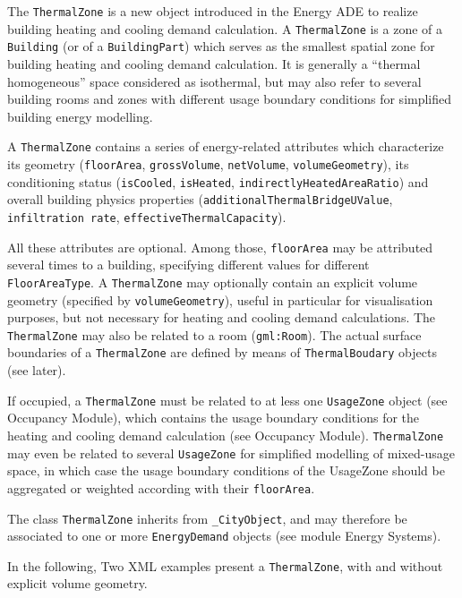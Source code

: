 \documentclass[a4paper,12pt]{article}
\begin{document}
The \lstinline!ThermalZone! is a new object introduced in the Energy ADE
to realize building heating and cooling demand calculation. A
\lstinline!ThermalZone! is a zone of a \lstinline!Building! (or of a
\lstinline!BuildingPart!) which serves as the smallest spatial zone for
building heating and cooling demand calculation. It is generally a
``thermal homogeneous'' space considered as isothermal, but may also
refer to several building rooms and zones with different usage boundary
conditions for simplified building energy modelling.

A \lstinline!ThermalZone! contains a series of energy-related attributes
which characterize its geometry (\lstinline!floorArea!,
\lstinline!grossVolume!, \lstinline!netVolume!,
\lstinline!volumeGeometry!), its conditioning status
(\lstinline!isCooled!, \lstinline!isHeated!,
\lstinline!indirectlyHeatedAreaRatio!) and overall building physics
properties (\lstinline!additionalThermalBridgeUValue!,
\lstinline!infiltration rate!, \lstinline!effectiveThermalCapacity!).

All these attributes are optional. Among those, \lstinline!floorArea!
may be attributed several times to a building, specifying different
values for different \lstinline!FloorAreaType!. A
\lstinline!ThermalZone! may optionally contain an explicit volume
geometry (specified by \lstinline!volumeGeometry!), useful in particular
for visualisation purposes, but not necessary for heating and cooling
demand calculations. The \lstinline!ThermalZone! may also be related to
a room (\lstinline!gml:Room!). The actual surface boundaries of a
\lstinline!ThermalZone! are defined by means of
\lstinline!ThermalBoudary! objects (see later).

If occupied, a \lstinline!ThermalZone! must be related to at less one
\lstinline!UsageZone! object (see Occupancy Module), which contains the
usage boundary conditions for the heating and cooling demand calculation
(see Occupancy Module). \lstinline!ThermalZone! may even be related to
several \lstinline!UsageZone! for simplified modelling of mixed-usage
space, in which case the usage boundary conditions of the UsageZone
should be aggregated or weighted according with their
\lstinline!floorArea!.

The class \lstinline!ThermalZone! inherits from \lstinline!_CityObject!,
and may therefore be associated to one or more \lstinline!EnergyDemand!
objects (see module Energy Systems).

In the following, Two XML examples present a \lstinline!ThermalZone!,
with and without explicit volume geometry.
\end{document}
